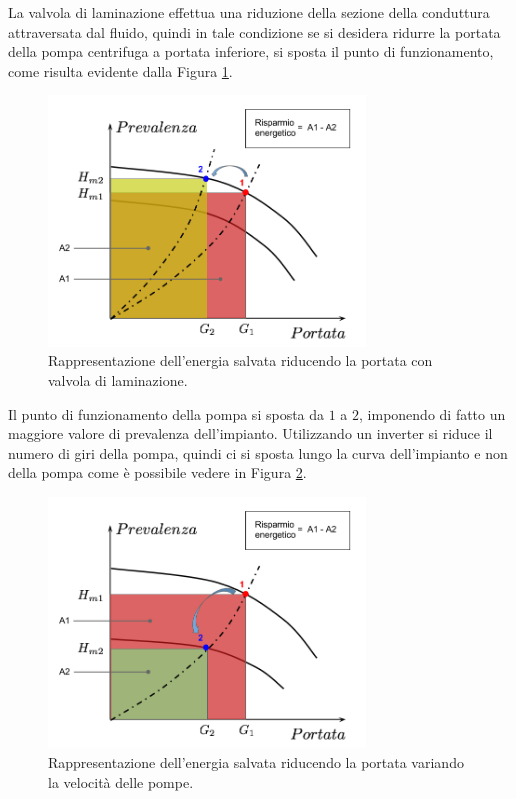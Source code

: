 \documentclass[laurea,oneside,11pt]{USiena_tesiLM}
\begin{document}
La valvola di laminazione effettua una riduzione della sezione della conduttura attraversata dal fluido, quindi in tale condizione se si desidera ridurre la portata della pompa centrifuga a portata inferiore, si sposta il punto di funzionamento, come risulta evidente dalla Figura \ref{fig:strozzatura}.

\begin{figure}[!ht]
\centering
\includegraphics[width=0.75\textwidth]{figure/strozzatura} 
\caption{Rappresentazione dell'energia salvata riducendo la portata con valvola di laminazione.}
\label{fig:strozzatura}
\end{figure}

Il punto di funzionamento della pompa si sposta da $1$ a $2$, imponendo di fatto un maggiore valore di prevalenza dell'impianto. Utilizzando un inverter si riduce il numero di giri della pompa, quindi ci si sposta lungo la curva dell'impianto e non della pompa come è possibile vedere in Figura \ref{fig:var_velocita}. 

\begin{figure}[!ht]
\centering
\includegraphics[width=0.75\textwidth]{figure/var_velocita} 
\caption{Rappresentazione dell'energia salvata riducendo la portata variando la velocità delle pompe.}
\label{fig:var_velocita}
\end{figure}
\end{document}
